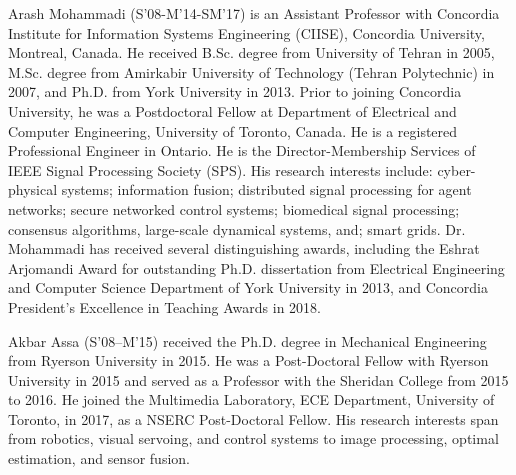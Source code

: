 \documentclass{ieeeaccess}
\begin{document}
\begin{IEEEbiography}{Arash Mohammadi}
	(S'08-M'14-SM'17) is an Assistant Professor with Concordia Institute for Information Systems Engineering (CIISE), Concordia University, Montreal, Canada. He received B.Sc. degree from University of Tehran in 2005, M.Sc. degree from Amirkabir University of Technology (Tehran Polytechnic) in 2007, and Ph.D. from York University in 2013. Prior to joining Concordia University, he was a Postdoctoral Fellow at Department of Electrical and Computer Engineering, University of Toronto, Canada. He is a registered Professional Engineer in Ontario. He is the Director-Membership Services  of IEEE Signal Processing Society (SPS). His research interests include: cyber-physical systems; information fusion; distributed signal processing for agent networks; secure networked control systems; biomedical signal processing; consensus algorithms, large-scale dynamical systems, and; smart grids. Dr. Mohammadi has received several distinguishing awards, including the Eshrat Arjomandi Award for outstanding Ph.D. dissertation from Electrical Engineering and Computer Science Department of York University in 2013, and Concordia President's Excellence  in Teaching Awards in 2018.
\end{IEEEbiography}

\begin{IEEEbiography}{Akbar Assa} (S'08–M'15) received the Ph.D. degree in Mechanical Engineering from Ryerson University in 2015. He was a Post-Doctoral Fellow with Ryerson University in 2015 and served as a Professor with the Sheridan College from 2015 to 2016. He joined the Multimedia Laboratory, ECE Department, University of Toronto, in 2017, as a
NSERC Post-Doctoral Fellow. His research interests span from robotics, visual servoing, and
control systems to image processing, optimal estimation, and sensor fusion.
\end{IEEEbiography}
\end{document}
